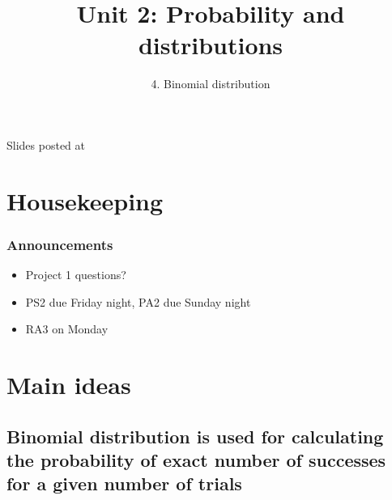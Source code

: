\documentclass[slidestop,compress,mathserif,12pt,t,professionalfonts,xcolor=table]{beamer}
\title{Unit 2: Probability and distributions}
\subtitle{4. Binomial distribution}
\author{\CourseName}
\date{}
\institute{\InstituteName}
\begin{document}



\begin{frame}[plain]

\titlepage

\vfill

{\scriptsize {} \hfill Slides posted at  \webURL{\CourseSite}}

\addtocounter{framenumber}{-1} 

\end{frame}


\section{Housekeeping}


\begin{frame}
\frametitle{Announcements}

\begin{itemize}

\item Project 1 questions?

\item PS2 due Friday night, PA2 due Sunday night

\item RA3 on Monday

\end{itemize}

\end{frame}


\section{Main ideas}


\subsection{Binomial distribution is used for calculating the probability of exact number of successes for a given number of trials}
\label{mi1}

\end{document}
